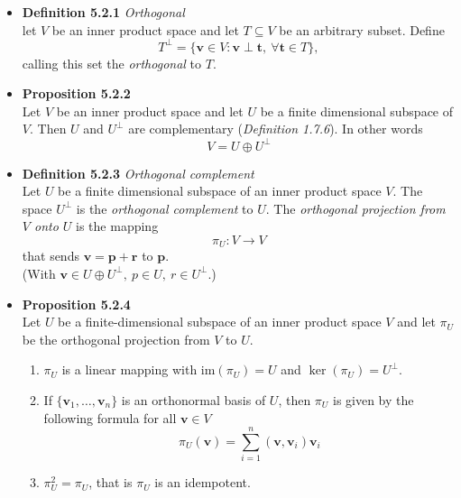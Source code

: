 \documentclass[11pt,a4paper]{article}
\begin{document}
\begin{itemize}

    \item \textbf{Definition 5.2.1} \emph{Orthogonal} \\
        let $V$ be an inner product space and let $T \subseteq V$ be an arbitrary subset.
        Define
        \[
            T^\perp = \{\mathbf{v} \in V : \mathbf{v} \perp \mathbf{t}, \ \forall
            \mathbf{t} \in T \},
        \]
        calling this set the \emph{orthogonal} to $T$.

    \item \textbf{Proposition 5.2.2} \\
        Let $V$ be an inner product space and let $U$ be a finite dimensional subspace of $V$.
        Then $U$ and $U^\perp$ are complementary (\emph{Definition 1.7.6}).
        In other words
        \[
            V = U \oplus U^\perp
        \]

    \item \textbf{Definition 5.2.3} \emph{Orthogonal complement} \\
        Let $U$ be a finite dimensional subspace of an inner product space $V$.
        The space $U^\perp$ is the \emph{orthogonal complement} to $U$.
        The \emph{orthogonal projection from $V$ onto $U$} is the mapping
        \[
            \pi_U : V \to V
        \]
        that sends $\mathbf{v} = \mathbf{p} + \mathbf{r}$ to $\mathbf{p}$. \\
        (With $\mathbf{v} \in U \oplus U^\perp, \ p \in U, \ r \in U^\perp$.)

    \item \textbf{Proposition 5.2.4} \\
        Let $U$ be a finite-dimensional subspace of an inner product space $V$ and let
        $\pi_U$ be the orthogonal projection from $V$ to $U$.
        \begin{enumerate}
            \item $\pi_U$ is a linear mapping with $\mathrm{im} (\pi_U) = U$ and
                $\ker(\pi_U) = U^\perp$.

            \item If $\{ \mathbf{v}_1, \ldots, \mathbf{v}_n\}$ is an orthonormal basis of $U$,
                then $\pi_U$ is given by the following formula for all $\mathbf{v} \in V$
                \[
                    \pi_U(\mathbf{v}) = \sum_{i=1}^n (\mathbf{v}, \mathbf{v}_i) \mathbf{v}_i
                \]
            \item $\pi_U^2 = \pi_U$, that is $\pi_U$ is an idempotent.
        \end{enumerate}


\end{itemize}
\end{document}
